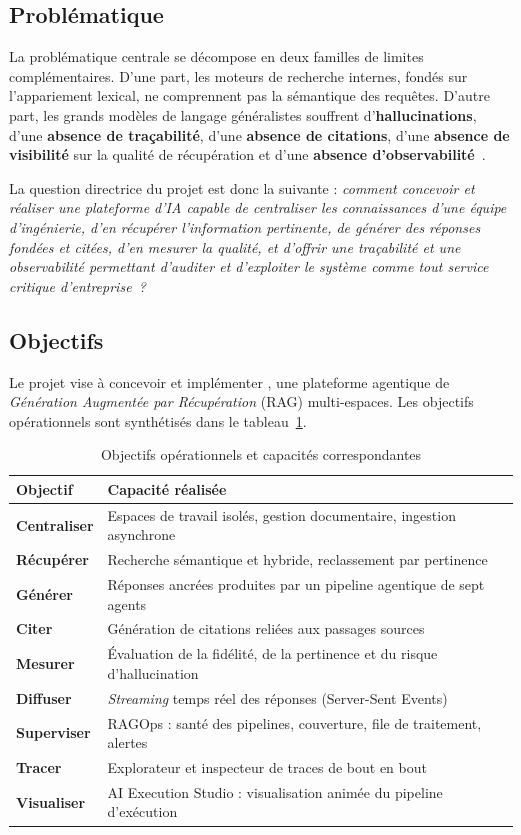 \subsection{Problématique}
La problématique centrale se décompose en deux familles de limites
complémentaires. D'une part, les moteurs de recherche internes, fondés sur
l'appariement lexical, ne comprennent pas la sémantique des requêtes. D'autre
part, les grands modèles de langage généralistes souffrent
d'\textbf{hallucinations}, d'une \textbf{absence de traçabilité}, d'une
\textbf{absence de citations}, d'une \textbf{absence de visibilité} sur la qualité
de récupération et d'une \textbf{absence d'observabilité}~\cite{lewis2020}.

La question directrice du projet est donc la suivante : \emph{comment concevoir et
réaliser une plateforme d'IA capable de centraliser les connaissances d'une équipe
d'ingénierie, d'en récupérer l'information pertinente, de générer des réponses
fondées et citées, d'en mesurer la qualité, et d'offrir une traçabilité et une
observabilité permettant d'auditer et d'exploiter le système comme tout service
critique d'entreprise~?}

\subsection{Objectifs}
Le projet vise à concevoir et implémenter \devpilot{}, une plateforme agentique de
\emph{Génération Augmentée par Récupération} (RAG) multi-espaces. Les objectifs
opérationnels sont synthétisés dans le tableau~\ref{tab:objectifs}.

\begin{table}[H]
\centering\caption{Objectifs opérationnels et capacités correspondantes}
\label{tab:objectifs}\small
\begin{tabularx}{\textwidth}{@{}>{\bfseries}l X@{}}
\toprule
Objectif & Capacité réalisée \\
\midrule
Centraliser & Espaces de travail isolés, gestion documentaire, ingestion asynchrone \\
Récupérer & Recherche sémantique et hybride, reclassement par pertinence \\
Générer & Réponses ancrées produites par un pipeline agentique de sept agents \\
Citer & Génération de citations reliées aux passages sources \\
Mesurer & Évaluation de la fidélité, de la pertinence et du risque d'hallucination \\
Diffuser & \emph{Streaming} temps réel des réponses (Server-Sent Events) \\
Superviser & RAGOps : santé des pipelines, couverture, file de traitement, alertes \\
Tracer & Explorateur et inspecteur de traces de bout en bout \\
Visualiser & AI Execution Studio : visualisation animée du pipeline d'exécution \\
\bottomrule
\end{tabularx}
\end{table}

